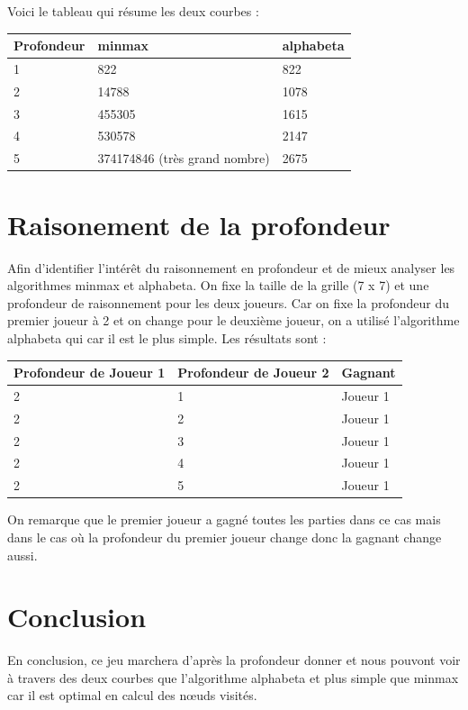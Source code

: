\documentclass[11pt, pdflatex]{report}
\begin{document}
Voici le tableau qui résume les deux courbes :
 
 \begin{center}
    \begin{tabular}{|l|l|l|}\hline   
    Profondeur&      minmax&      alphabeta      \\\hline
    1&      822&      822      \\\hline
    2&      14788&      1078      \\\hline
    3&      455305&      1615      \\\hline
    4&      530578&      2147      \\\hline
    5&      374174846 (très grand nombre)&      2675      \\\hline
    \end{tabular}
\end{center}

\newpage
\section{Raisonement de la profondeur}
Afin d’identifier l’intérêt du raisonnement en profondeur et de mieux analyser les algorithmes minmax et alphabeta. On fixe la taille de la grille (7 x 7)  et une profondeur de raisonnement pour les deux joueurs. Car on fixe la profondeur du premier joueur à 2 et on change pour le deuxième joueur, on a utilisé l’algorithme alphabeta qui car il est le plus simple. Les résultats sont :  \par

\begin{center}
    \begin{tabular}{|l|l|l|}\hline   
        Profondeur de Joueur 1\up{er}&      Profondeur de Joueur 2\up{ème}&      Gagnant      \\\hline
    2&      1&      Joueur 1\up{er}      \\\hline
    2&      2&      Joueur 1\up{er}      \\\hline
    2&      3&      Joueur 1\up{er}      \\\hline
    2&      4&      Joueur 1\up{er}      \\\hline
    2&      5&      Joueur 1\up{er}      \\\hline
    \end{tabular}
\end{center}

On remarque que le premier joueur a gagné toutes les parties dans ce cas mais dans le cas où la profondeur du premier joueur change donc la gagnant change aussi.\par

\section{Conclusion}
En conclusion, ce jeu marchera d’après la profondeur donner et nous pouvont voir à travers des deux courbes que l’algorithme alphabeta et plus simple que minmax car il est optimal en calcul des nœuds visités. 
\end{document}
